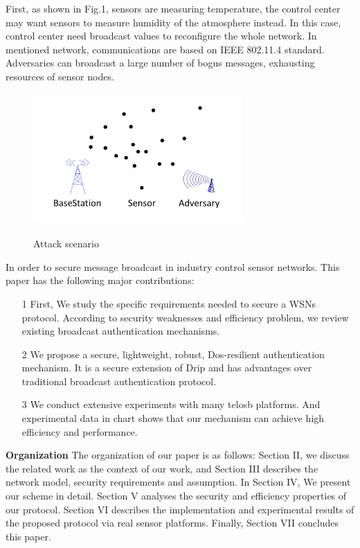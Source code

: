 \documentclass{sig-alternate-05-2015}
\begin{document}
First, as shown in Fig.1, sensors are measuring temperature, the control center may want sensors to measure humidity of the atmosphere instead. In this case, control center need broadcast values to reconfigure the whole network. 
In mentioned network, communications are based on IEEE 802.11.4 standard. Adversaries can broadcast a large number of bogus messages, exhausting resources of sensor nodes.

\begin{figure}
\centering
\includegraphics[width=8cm,height=5cm]{Attack_Scenario2.pdf}\\
\caption{Attack scenario}\label{}   
\end{figure}

In order to secure message broadcast in industry control sensor networks.
This paper has the following major contributions:
\begin{itemize}
\item[1] First, We study the specific requirements needed to secure a WSNs protocol. According to security weaknesses and efficiency problem, we 
review existing broadcast authentication mechanisms.
\item[2] We propose a secure, lightweight, robust, Dos-resilient authentication mechanism. It is a secure extension of Drip and has advantages over traditional broadcast authentication protocol. 
\item[3] We conduct extensive experiments with many telosb platforms. And experimental data in chart shows that our mechanism can achieve high efficiency and performance.
\end{itemize}

\textbf{Organization} The organization of our paper is as follows:  Section II, we discuss the related work as the context of our work, and Section III describes the network model, security requirements and assumption. In Section IV, We present our scheme in detail. Section V analyses the security and efficiency properties of our protocol. Section VI describes the implementation and experimental results of the proposed protocol via real sensor platforms. Finally, Section VII concludes this paper. 
\end{document}

